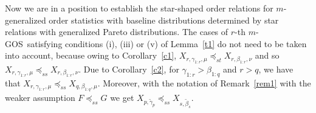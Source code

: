 \documentclass [11pt]{article}
\newcommand{\gos}{GOS}
\begin{document}
Now we are in a position to establish the star-shaped order relations for $m$-generalized order statistics with baseline distributions determined by star relations with generalized Pareto distributions.
The cases of $r$-th $m$-\gos\ satisfying conditions (i), (iii) or (v) %
of Lemma~\ref{t1} do not need to be taken into account, because owing to Corollary~\ref{c1}, $X_{r,\gamma_{1:r}, \mu} \preceq_{st}X_{r, \beta_{1:r},\nu}$ and so $X_{r,\gamma_{1:r}, \mu} \preceq_{ss} X_{r, \beta_{1:r},\nu}$. %
Due to Corollary~\ref{c2}, for $\gamma_{1:r}> \beta_{1:q}$ and $r>q$, we have that $X_{r,\gamma_{1:r}, \mu} \preceq_{ss} X_{q, \beta_{1:q},\mu}$.
Moreover, with the notation of Remark~\ref{rem1} with the weaker assumption $F \preceq_{ss} G$ we get
$X_{p,\tilde{\gamma}_p} \preceq_{ss} X_{s,\tilde{\beta}_s}$.
\end{document}
